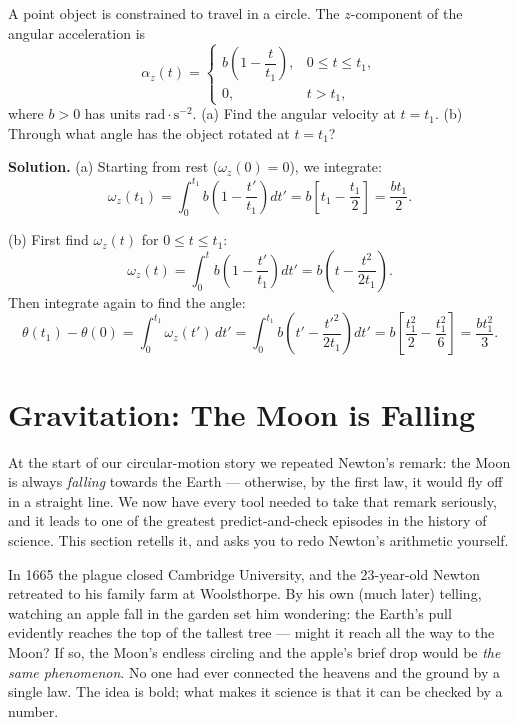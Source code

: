 \begin{workedexample}
A point object is constrained to travel in a circle. The $z$-component of the angular acceleration is
\[
    \alpha_z(t) = \begin{cases} b\!\left(1 - \dfrac{t}{t_1}\right), & 0 \leq t \leq t_1, \\[4pt] 0, & t > t_1, \end{cases}
\]
where $b > 0$ has units $\mathrm{rad\cdot s^{-2}}$. (a) Find the angular velocity at $t = t_1$. (b) Through what angle has the object rotated at $t = t_1$?

\noindent\textbf{Solution.} (a) Starting from rest ($\omega_z(0) = 0$), we integrate:
\[
    \omega_z(t_1) = \int_0^{t_1} b\!\left(1 - \frac{t'}{t_1}\right)dt' = b\!\left[t_1 - \frac{t_1}{2}\right] = \frac{bt_1}{2}.
\]

(b) First find $\omega_z(t)$ for $0 \leq t \leq t_1$:
\[
    \omega_z(t) = \int_0^t b\!\left(1 - \frac{t'}{t_1}\right)dt' = b\!\left(t - \frac{t^2}{2t_1}\right).
\]
Then integrate again to find the angle:
\[
    \theta(t_1) - \theta(0) = \int_0^{t_1}\omega_z(t')\,dt' = \int_0^{t_1} b\!\left(t' - \frac{t'^2}{2t_1}\right)dt' = b\!\left[\frac{t_1^2}{2} - \frac{t_1^2}{6}\right] = \frac{bt_1^2}{3}.
\]
\end{workedexample}


\newpage
\section{Gravitation: The Moon is Falling}

At the start of our circular-motion story we repeated Newton's remark: the
Moon is always \emph{falling} towards the Earth --- otherwise, by the first
law, it would fly off in a straight line. We now have every tool needed to
take that remark seriously, and it leads to one of the greatest
predict-and-check episodes in the history of science. This section retells
it, and asks you to redo Newton's arithmetic yourself.

In 1665 the plague closed Cambridge University, and the 23-year-old Newton
retreated to his family farm at Woolsthorpe. By his own (much later) telling,
watching an apple fall in the garden set him wondering: the Earth's pull
evidently reaches the top of the tallest tree --- might it reach all the way
to the Moon? If so, the Moon's endless circling and the apple's brief drop
would be \emph{the same phenomenon}. No one had ever connected the heavens
and the ground by a single law. The idea is bold; what makes it science is
that it can be checked by a number.

